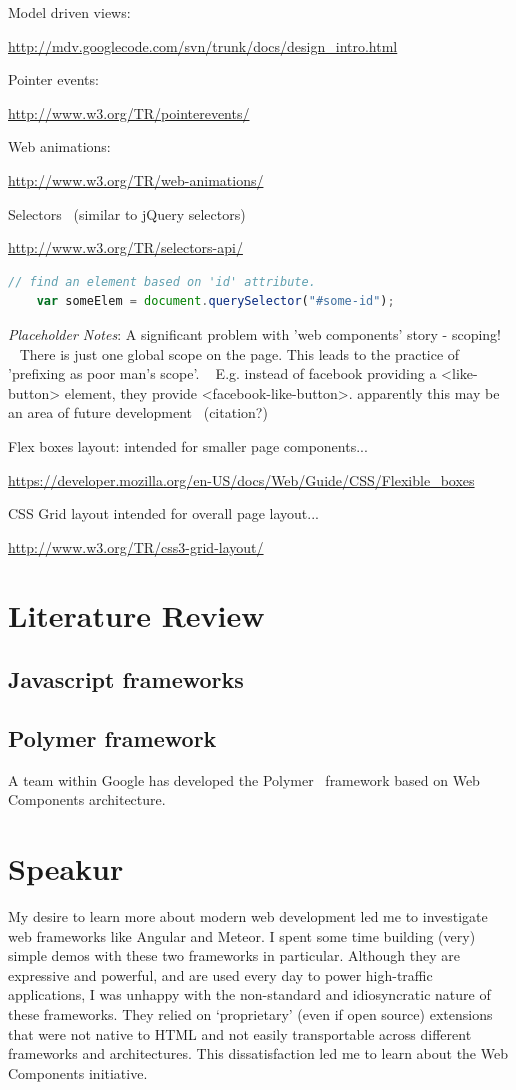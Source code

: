 Model driven views:

\url{http://mdv.googlecode.com/svn/trunk/docs/design_intro.html}

Pointer events:

\url{http://www.w3.org/TR/pointerevents/}

Web animations:

\url{http://www.w3.org/TR/web-animations/}

Selectors  (similar to jQuery selectors)

\url{http://www.w3.org/TR/selectors-api/}

\begin{lstlisting}[language=JavaScript,numbers=none]
	// find an element based on 'id' attribute.
	var someElem = document.querySelector("#some-id");
\end{lstlisting}

\textit{Placeholder Notes}:
A significant problem with 'web components' story - scoping!  
There is just one global scope on the page.
This leads to the practice of 'prefixing as poor man's scope'.  
E.g. instead of facebook providing a <like-button> element, they provide <facebook-like-button>.
apparently this may be an area of future development  (citation?)

Flex boxes layout: intended for smaller page components...

\url{https://developer.mozilla.org/en-US/docs/Web/Guide/CSS/Flexible_boxes}


CSS Grid layout intended for overall page layout...

\url{http://www.w3.org/TR/css3-grid-layout/}


\section{Literature Review}
\subsection{Javascript frameworks}
\subsection{Polymer framework}
A team within Google has developed the Polymer~\cite{polymercontributors2015} framework based on Web Components architecture.

\section{Speakur}
My desire to learn more about modern web development led me to investigate web frameworks like Angular and Meteor.
I spent some time building (very) simple demos with these two frameworks in particular.
Although they are expressive and powerful, and are used every day to power high-traffic applications, 
I was unhappy with the non-standard and idiosyncratic nature of these frameworks. 
They relied on `proprietary' (even if open source) extensions that were not native to HTML and not easily transportable across different frameworks and architectures.
This dissatisfaction led me to learn about the Web Components initiative.

